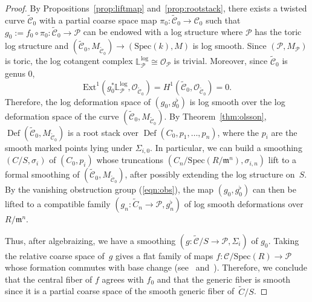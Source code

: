 \documentclass[11pt]{amsart}
\numberwithin{equation}{section}
\theoremstyle{definition}
\theoremstyle{remark}
\newcommand{\bLl}{\mathbb L^{\mathrm{log}}}
\newcommand{\Ext}{\mathrm{Ext}}
\DeclareMathOperator{\Def}{Def}
\newcommand{\calO}{\mathcal O}
\newcommand{\calC}{\mathcal C}
\newcommand{\calP}{\mathcal P}
\newcommand{\Spec}{\mathrm{Spec}}
\begin{document}
\begin{proof}
By Propositions~\ref{prop:liftmap} and~\ref{prop:rootstack}, there exists a twisted curve $\tilde{\calC}_0$ with a partial coarse space map $\pi_0 \colon  \tilde{\calC}_0 \to \calC_0$ such that $g_0 := f_0 \circ \pi_0 \colon  \tilde{\calC}_0 \to \calP$ can be endowed with a log structure where $\calP$ has the toric log structure and $(\tilde{\calC}_0, M_{\tilde{\calC}_0}) \to (\Spec(k), M)$ is log smooth. Since $(\calP, M_{\calP})$ is toric, the log cotangent complex $\bLl_{\calP} \cong \calO_\calP$ is trivial. Moreover, since $\tilde{\calC}_0$ is genus $0$, 
\begin{equation}\label{eqn:obs}
\Ext^1(g_0^*\bLl_{\calP}, \calO_{\tilde{\calC}_0}) =  H^1(\tilde{\calC}_0, \calO_{\tilde{\calC}_0}) = 0.
\end{equation}
Therefore, the log deformation space of $(g_0,g_0^\flat)$ is log smooth over the log deformation space of the curve $(\tilde{\calC}_0, M_{\tilde{\calC}_0})$. By Theorem~\ref{thm:olsson}, $\Def(\tilde{\calC}_0, M_{\tilde{\calC}_0})$ is a root stack over $\Def(C_0, p_1, \ldots, p_n)$, where the $p_i$ are the smooth marked points lying under $\Sigma_{i,0}$. In particular, we can build a smoothing $(C/S, \sigma_i)$ of $(C_0, p_i)$ whose truncations $(C_n/\Spec (R/\mathfrak{m}^n), \sigma_{i,n})$ lift to a formal smoothing of $(\tilde{\calC}_0,M_{\tilde{\calC}_0})$, after possibly extending the log structure on~$S$. By the vanishing obstruction group (\ref{eqn:obs}), the map $(g_0, g_0^\flat)$ can then be lifted to a compatible family $(g_n \colon  \tilde{C}_n \to \calP, g_n^\flat)$ of log smooth deformations over $R/\mathfrak{m}^n$. 

Thus, after algebraizing, we have a smoothing $(g \colon  \tilde{\calC}/S \to \calP, \Sigma_i)$ of $g_0$. Taking the relative coarse space of~$g$ gives a flat family of maps $f \colon  \calC/\Spec (R) \to \calP$ whose formation commutes with base change (see~\cite[Proposition 3.4]{AOV11} and~\cite[Corollary 3.3]{AOV08}). Therefore, we conclude that the central fiber of $f$ agrees with $f_0$ and that the generic fiber is smooth since it is a partial coarse space of the smooth generic fiber of~$\tilde{C}/S$.   
\end{proof} 
\end{document}
